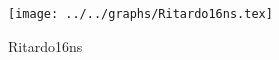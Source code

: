 \begin{figure}[h] \centering\texttt{[image: ../../graphs/Ritardo16ns.tex]}\caption{Ritardo16ns}\label{gr:Ritardo16ns} \end{figure}
